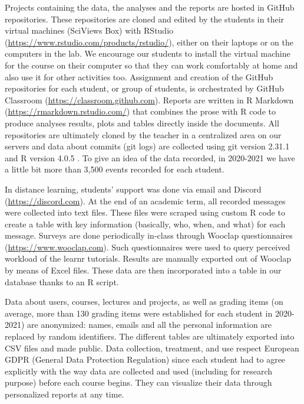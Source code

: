 \documentclass{aims}
\theoremstyle{definition}
\begin{document}
Projects containing the data, the analyses and the reports are hosted in
GitHub repositories. These repositories are cloned and edited by the
students in their virtual machines (SciViews Box) with RStudio
(\url{https://www.rstudio.com/products/rstudio/}), either on their
laptops or on the computers in the lab. We encourage our students to
install the virtual machine for the course on their computer so that
they can work comfortably at home and also use it for other activities
too. Assignment and creation of the GitHub repositories for each
student, or group of students, is orchestrated by GitHub Classroom
(\url{https://classroom.github.com}). Reports are written in R Markdown
(\url{https://rmarkdown.rstudio.com/}) that combines the prose with R
code to produce analyses results, plots and tables directly inside the
documents. All repositories are ultimately cloned by the teacher in a
centralized area on our servers and data about commits (git logs) are
collected using git version 2.31.1 and R version 4.0.5
\cite{Rcoreteam2021}. To give an idea of the data recorded, in 2020-2021
we have a little bit more than 3,500 events recorded for each student.

In distance learning, students' support was done via email and Discord
(\url{https://discord.com}). At the end of an academic term, all
recorded messages were collected into text files. These files were
scraped using custom R code to create a table with key information
(basically, who, when, and what) for each message. Surveys are done
periodically in-class through Wooclap questionnaires
(\url{https://www.wooclap.com}). Such questionnaires were used to query
perceived workload of the learnr tutorials. Results are manually
exported out of Wooclap by means of Excel files. These data are then
incorporated into a table in our database thanks to an R script.

Data about users, courses, lectures and projects, as well as grading
items (on average, more than 130 grading items were established for each
student in 2020-2021) are anonymized: names, emails and all the personal
information are replaced by random identifiers. The different tables are
ultimately exported into CSV files and made public. Data collection,
treatment, and use respect European GDPR (General Data Protection
Regulation) since each student had to agree explicitly with the way data
are collected and used (including for research purpose) before each
course begins. They can visualize their data through personalized
reports at any time.
\end{document}
